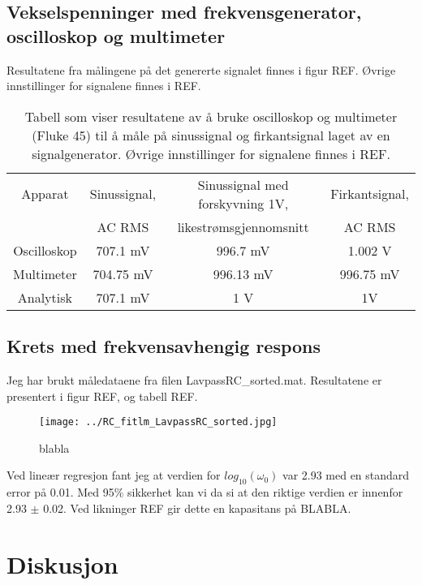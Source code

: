 \documentclass[reprint, english,notitlepage]{revtex4-1}  %
\begin{document}
\subsection{Vekselspenninger med frekvensgenerator, oscilloskop og multimeter}
Resultatene fra målingene på det genererte signalet finnes i figur REF. Øvrige innstillinger for signalene finnes i REF.
\begin{table}[p]
\label{fig:tabell_AC_RMS}
\caption{Tabell som viser resultatene av å bruke oscilloskop og multimeter (Fluke 45) til å måle på sinussignal og firkantsignal laget av en signalgenerator. Øvrige innstillinger for signalene finnes i REF.}

\begin{adjustbox}{width=\linewidth}
\begin{tabular}{||c || c | c | c||}
\hline
Apparat     & Sinussignal, & Sinussignal med forskyvning 1V, & Firkantsignal, \\
            & AC RMS      & likestrømsgjennomsnitt          & AC RMS        \\ \hline\hline
Oscilloskop & 707.1 mV    & 996.7 mV                        & 1.002 V       \\ \hline
Multimeter  & 704.75 mV   & 996.13 mV                       & 996.75 mV     \\ \hline
Analytisk   & 707.1 mV    & 1 V                             & 1V            \\ \hline
\end{tabular}
\end{adjustbox}
\end{table}

\subsection{Krets med frekvensavhengig respons}
Jeg har brukt måledataene fra filen LavpassRC\_sorted.mat. Resultatene er presentert i figur REF, og tabell REF.
\begin{figure}
  \texttt{[image: ../RC\_fitlm\_LavpassRC\_sorted.jpg]}
  \caption{blabla}
  \label{fig:LavpassRC}
\end{figure}
Ved lineær regresjon fant jeg at verdien for $log_{10}(\omega_0)$ var 2.93 med en standard error på 0.01. Med 95\% sikkerhet kan vi da si at den riktige verdien er innenfor 2.93 $\pm$ 0.02. Ved likninger REF gir dette en kapasitans på BLABLA.


\section{Diskusjon}
\end{document}
